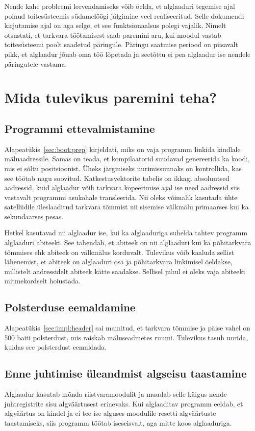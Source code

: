 \documentclass[12pt,a4paper]{article}
\begin{document}
Nende kahe probleemi leevendamiseks võib öelda, et alglaaduri tegemise ajal
polnud toitesüsteemis südamelöögi jälgimine veel realiseeritud. Selle dokumendi
kirjutamise ajal on aga selge, et see funktsionaalsus polegi vajalik. Nimelt
otsustati, et tarkvara töötamisest saab paremini aru, kui moodul vastab
toitesüsteemi poolt saadetud päringule. Päringu saatmise periood on piisavalt
pikk, et alglaadur jõuab oma töö lõpetada ja seetõttu ei pea alglaadur ise
nendele päringutele vastama.

\label{sec:prob:beat}
\section{Mida tulevikus paremini teha?}
\subsection{Programmi ettevalmistamine}
Alapeatükis~\ref{sec:boot:prep} kirjeldati, miks on vaja programm linkida
kindlale mälu\-aadressile. Samas on teada, et kompilaatorid suudavad genereerida
ka koodi, mis ei sõltu positsioonist. Üheks järgmiseks uurimissuunaks on
kontrollida, kas see töötab nagu soovitud. Katkestusvektorite tabelis on ikkagi
absoluutsed aadressid, kuid alglaadur võib tarkvara kopeerimise ajal ise need
aadressid siis vastavalt programmi asukohale transleerida. Nii oleks võimalik
kasutada ühte satelliidile üleslaaditud tarkvara tõmmist nii sisemise välkmälu
primaarses kui ka sekundaarses pesas.

Hetkel kasutavad nii alglaadur ise, kui ka alglaaduriga suhelda tahtev programm
alglaaduri abiteeki. See tähendab, et abiteek on nii alglaaduri kui ka
põhitarkvara tõmmises ehk abiteek on välkmälus korduvalt. Tulevikus võib
kaaluda sellist lähenemist, et abiteek on alglaaduri osa ja põhitarkvara
linkimisel öeldakse, millistelt aadressidelt abiteek kätte saadakse. Sellisel
juhul ei oleks vaja abiteeki mitmekordselt hoiustada.

\subsection{Polsterduse eemaldamine}
Alapeatükis~\ref{sec:impl:header} sai mainitud, et tarkvara tõmmise ja
päise vahel on 500 baiti polsterdust, mis raiskab mäluseadmetes ruumi. Tulevikus
tasub uurida, kuidas see polsterdust eemaldada.

\subsection{Enne juhtimise üleandmist algseisu taastamine}
Alglaadur kasutab mõnda riistvaramoodulit ja muudab selle käigus nende
juhtregistrite sisu algväärtusest erinevaks. Kui alglaaditav programm eeldab,
et algväärtus on kindel ja ei tee ise alguses moodulile resetti algväärtuste
taastamiseks, siis programm töötab iseseisvalt, aga mitte koos alglaaduriga.
\end{document}
